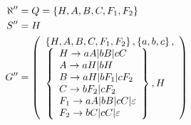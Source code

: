 \begin{align*}
	\aleph'' & = Q = \cbr{H, A, B, C, F_1, F_2}                  \\
	S''      & = H                                               \\
	G''      & = \grammatics{H, A, B, C, F_1, F_2}{\cbr{a,b,c}}{ %
	H \to aA|bB|cC                                               \\
	A \to aH|bH                                                  \\
	B \to aH|bF_1|cF_2                                           \\
	C \to bF_2|cF_2                                              \\
	F_1 \to aA|bB|cC|\varepsilon                                 \\
		F_2 \to bC|cC|\varepsilon
	}{H}
\end{align*}
